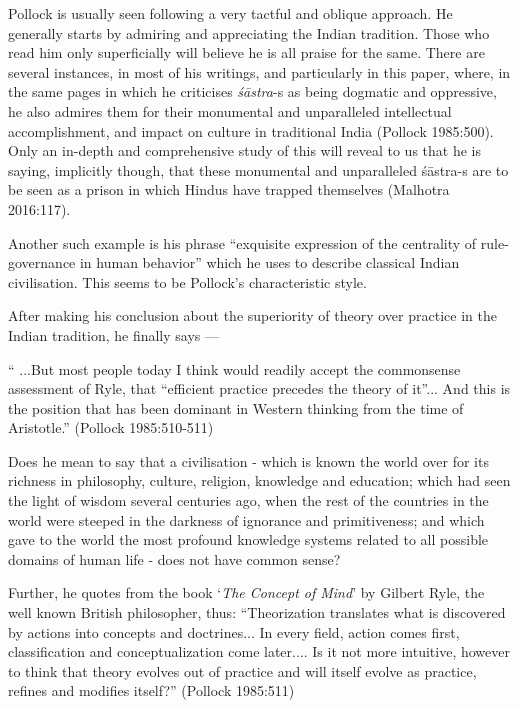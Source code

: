 Pollock is usually seen following a very tactful and oblique approach. He generally starts by admiring and appreciating the Indian tradition. Those who read him only superficially will believe he is all praise for the same. There are several instances, in most of his writings, and particularly in this paper, where, in the same pages in which he criticises {\it śāstra}-s as being dogmatic and oppressive, he also admires them for their monumental and unparalleled intellectual accomplishment, and impact on culture in traditional India (Pollock 1985:500). Only an in-depth and comprehensive study of this will reveal to us that he is saying, implicitly though, that these monumental and unparalleled śāstra-s are to be seen as a prison in which Hindus have trapped themselves (Malhotra 2016:117). 

Another such example is his phrase ``exquisite expression of the centrality of rule-governance in human behavior'' which he uses to describe classical Indian civilisation. This seems to be Pollock's characteristic style.

After making his conclusion about the superiority of theory over practice in the Indian tradition, he finally says ---
\begin{myquote}
`` ...But most people today I think would readily accept the commonsense assessment of Ryle, that ``efficient practice precedes the theory of it''... And this is the position that has been dominant in Western thinking from the time of Aristotle.'' (Pollock 1985:510-511)
\end{myquote}

Does he mean to say that a civilisation - which is known the world over for its richness in philosophy, culture, religion, knowledge and education; which had seen the light of wisdom several centuries ago, when the rest of the countries in the world were steeped in the darkness of ignorance and primitiveness; and which gave to the world the most profound knowledge systems related to all possible domains of human life - does not have common sense?

Further, he quotes from the book `\textit{The Concept of Mind}' by Gilbert Ryle, the well known British philosopher, thus: ``Theorization translates what is discovered by actions into concepts and doctrines... In every field, action comes first, classification and conceptualization come later.... Is it not more intuitive, however to think that theory evolves out of practice and will itself evolve as practice, refines and modifies itself?'' (Pollock 1985:511)

